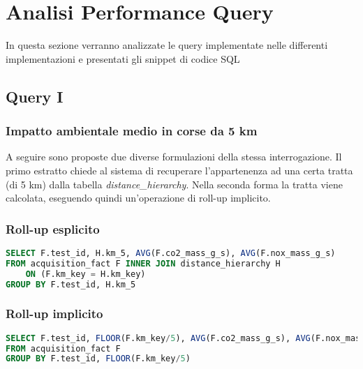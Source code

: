 \section{Analisi Performance Query}
In questa sezione verranno analizzate le query implementate nelle differenti implementazioni e presentati gli snippet di codice SQL

\subsection{Query I}
\subsubsection{Impatto ambientale medio in corse da 5 km}

A seguire sono proposte due diverse formulazioni della stessa interrogazione. Il primo estratto chiede al sistema di recuperare l'appartenenza ad una certa tratta (di 5 km) dalla tabella \textit{distance\_hierarchy}. Nella seconda forma la tratta viene calcolata, eseguendo quindi un'operazione di roll-up implicito.
\subsubsection{Roll-up esplicito}
\begin{lstlisting}[language=SQL]
SELECT F.test_id, H.km_5, AVG(F.co2_mass_g_s), AVG(F.nox_mass_g_s)
FROM acquisition_fact F INNER JOIN distance_hierarchy H
	ON (F.km_key = H.km_key)
GROUP BY F.test_id, H.km_5
\end{lstlisting}

\subsubsection{Roll-up implicito}
\begin{lstlisting}[language=SQL]
SELECT F.test_id, FLOOR(F.km_key/5), AVG(F.co2_mass_g_s), AVG(F.nox_mass_g_s)
FROM acquisition_fact F
GROUP BY F.test_id, FLOOR(F.km_key/5)
\end{lstlisting}

